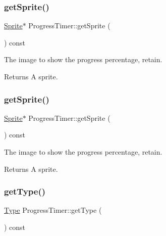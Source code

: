 \subsubsection{\texorpdfstring{get\+Sprite()}{getSprite()}\hspace{0.1cm}{\footnotesize\ttfamily [1/2]}}
{\footnotesize\ttfamily \hyperlink{classSprite}{Sprite}$\ast$ Progress\+Timer\+::get\+Sprite (\begin{DoxyParamCaption}{ }\end{DoxyParamCaption}) const\hspace{0.3cm}{\ttfamily [inline]}}

The image to show the progress percentage, retain.

\begin{DoxyReturn}{Returns}
A sprite. 
\end{DoxyReturn}
\mbox{\label{classProgressTimer_abf78b31860b22109143633f44508233f}} 
\subsubsection{\texorpdfstring{get\+Sprite()}{getSprite()}\hspace{0.1cm}{\footnotesize\ttfamily [2/2]}}
{\footnotesize\ttfamily \hyperlink{classSprite}{Sprite}$\ast$ Progress\+Timer\+::get\+Sprite (\begin{DoxyParamCaption}{ }\end{DoxyParamCaption}) const\hspace{0.3cm}{\ttfamily [inline]}}

The image to show the progress percentage, retain.

\begin{DoxyReturn}{Returns}
A sprite. 
\end{DoxyReturn}
\mbox{\label{classProgressTimer_a322177b2b80d358482270730ba811cbd}} 
\subsubsection{\texorpdfstring{get\+Type()}{getType()}\hspace{0.1cm}{\footnotesize\ttfamily [1/2]}}
{\footnotesize\ttfamily \hyperlink{classProgressTimer_a9638d092b86d51bce727621b1a70d32f}{Type} Progress\+Timer\+::get\+Type (\begin{DoxyParamCaption}{ }\end{DoxyParamCaption}) const\hspace{0.3cm}{\ttfamily [inline]}}

